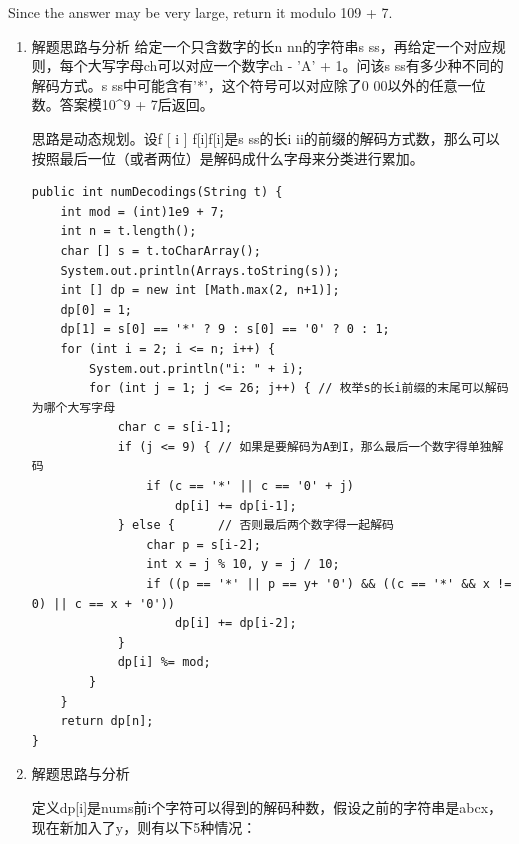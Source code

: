\documentclass[9pt, b5paaper]{book}
\begin{document}
Since the answer may be very large, return it modulo 109 + 7.
\begin{enumerate}
\item 解题思路与分析
\label{sec-1-4-60-0-1}
给定一个只含数字的长n nn的字符串s ss，再给定一个对应规则，每个大写字母ch可以对应一个数字ch - 'A' + 1。问该s ss有多少种不同的解码方式。s ss中可能含有'*'，这个符号可以对应除了0 00以外的任意一位数。答案模10\^{}9 + 7后返回。

思路是动态规划。设f [ i ] f[i]f[i]是s ss的长i ii的前缀的解码方式数，那么可以按照最后一位（或者两位）是解码成什么字母来分类进行累加。
\begin{verbatim}
public int numDecodings(String t) {
    int mod = (int)1e9 + 7;
    int n = t.length();
    char [] s = t.toCharArray();
    System.out.println(Arrays.toString(s));
    int [] dp = new int [Math.max(2, n+1)];
    dp[0] = 1;
    dp[1] = s[0] == '*' ? 9 : s[0] == '0' ? 0 : 1;
    for (int i = 2; i <= n; i++) {
        System.out.println("i: " + i);
        for (int j = 1; j <= 26; j++) { // 枚举s的长i前缀的末尾可以解码为哪个大写字母
            char c = s[i-1];
            if (j <= 9) { // 如果是要解码为A到I，那么最后一个数字得单独解码
                if (c == '*' || c == '0' + j)
                    dp[i] += dp[i-1];
            } else {      // 否则最后两个数字得一起解码
                char p = s[i-2];
                int x = j % 10, y = j / 10;
                if ((p == '*' || p == y+ '0') && ((c == '*' && x != 0) || c == x + '0')) 
                    dp[i] += dp[i-2];
            }
            dp[i] %= mod;
        }
    }
    return dp[n];
}
\end{verbatim}
\item 解题思路与分析
\label{sec-1-4-60-0-2}

定义dp[i]是nums前i个字符可以得到的解码种数，假设之前的字符串是abcx，现在新加入了y，则有以下5种情况：


\end{enumerate}
\end{document}
